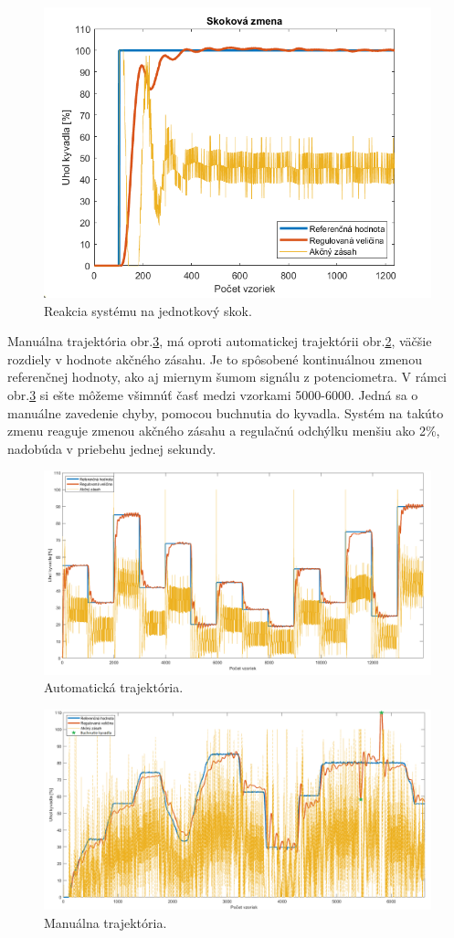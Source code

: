 \begin{figure}[!tbh]
	\centering
	\includegraphics[width=120mm]{obr/SkokovaZmena.png}
	\caption{Reakcia systému na jednotkový skok.}\label{OBRAZOK 2.5.1}
\end{figure}

Manuálna trajektória obr.\ref{OBRAZOK 2.5.3}, má oproti automatickej trajektórii obr.\ref{OBRAZOK 2.5.2}, väčšie rozdiely v hodnote akčného zásahu. Je to spôsobené kontinuálnou zmenou referenčnej hodnoty, ako aj miernym šumom signálu z potenciometra. V rámci obr.\ref{OBRAZOK 2.5.3} si ešte môžeme všimnúť časť medzi vzorkami 5000-6000. Jedná sa o manuálne zavedenie chyby, pomocou buchnutia do kyvadla. Systém na takúto zmenu reaguje zmenou akčného zásahu a regulačnú odchýlku menšiu ako 2\%, nadobúda v priebehu jednej sekundy. 

\begin{figure}[!tbh]
	\centering
	\includegraphics[width=150mm]{obr/Auto3.png}
	\caption{Automatická trajektória.}\label{OBRAZOK 2.5.2}
\end{figure}

\begin{figure}[!tbh]
	\centering
	\includegraphics[width=150mm]{obr/potentio.png}
	\caption{Manuálna trajektória.}\label{OBRAZOK 2.5.3}
\end{figure}
